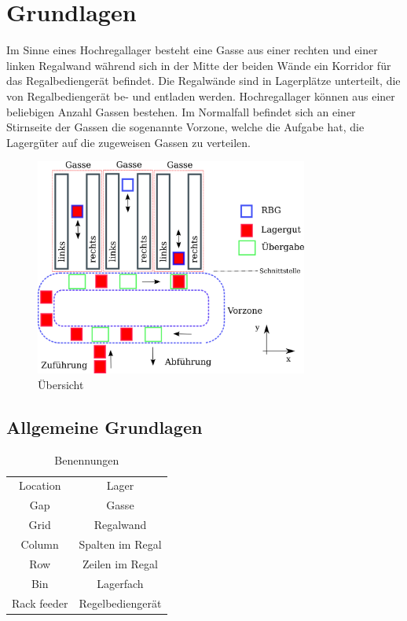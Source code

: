 \section{Grundlagen}
Im Sinne eines Hochregallager besteht eine Gasse aus einer rechten und einer linken Regalwand während sich in der Mitte der beiden Wände ein Korridor für das Regalbediengerät befindet. Die Regalwände sind in Lagerplätze unterteilt, die von Regalbediengerät be- und entladen werden. Hochregallager können aus einer beliebigen Anzahl Gassen bestehen. Im Normalfall befindet sich an einer Stirnseite der Gassen die sogenannte Vorzone, welche die Aufgabe hat, die Lagergüter auf die zugeweisen Gassen zu verteilen. 
%
\begin{figure}[H]
  \begin{center}
    \includegraphics[width=0.8\textwidth]{images/uebersicht.png}
    \caption{Übersicht}
    \label{fig:overview}
  \end{center}
\end{figure}
%

%
\subsection{Allgemeine Grundlagen}

%
\begin{table}[H]
  \caption{Benennungen}
  \label{tab:desc}

  \begin{center}
    \begin{tabular}{cc}
       Location & Lager\\
       Gap & Gasse\\
       Grid & Regalwand \\
       Column & Spalten im Regal \\
       Row & Zeilen im Regal \\
       Bin & Lagerfach \\
       Rack feeder & Regelbediengerät \\
    \end{tabular}
  \end{center}
\end{table}
%

